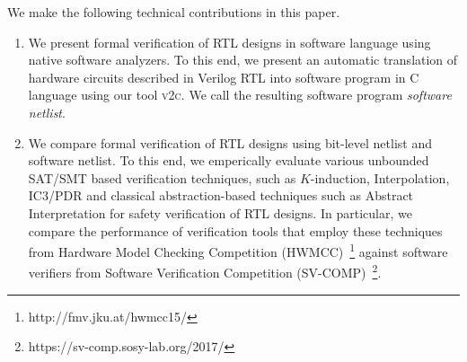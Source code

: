 We make the following technical contributions in this paper.
%
\begin{enumerate}
\item We present formal verification of RTL designs in software language 
using native software analyzers.  To this end, we present an automatic 
translation of hardware circuits described in Verilog RTL into software 
program in C language using our tool \textsc{v2c}.  We call the resulting 
software program {\em software netlist}.  

\item We compare formal verification of RTL designs 
using bit-level netlist and software netlist.  
To this end, we emperically evaluate various unbounded SAT/SMT based verification techniques, 
such as $K$-induction, Interpolation, IC3/PDR and classical abstraction-based 
techniques such as Abstract Interpretation for safety verification of RTL designs.  
%    
In particular, we compare the performance of verification 
tools that employ these techniques from Hardware Model Checking Competition 
(HWMCC)~\footnote{http://fmv.jku.at/hwmcc15/} against software verifiers from Software 
Verification Competition (SV-COMP)~\footnote{https://sv-comp.sosy-lab.org/2017/}.


\end{enumerate}

